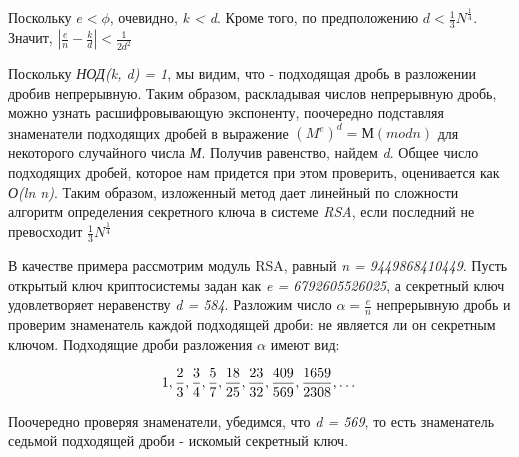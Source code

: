   Поскольку \textit{{$e < \phi$}}, очевидно, \textit{k < d}. Кроме того, по предположению \textit{{$d < \frac{1}{3} N^\frac{1}{4} $}}. Значит, 
  \textit{{$ |\frac{e}{n} - \frac{k}{d}| < \frac{1}{2 d^2} $}}
  
  Поскольку \textit{НОД(k, d) = 1}, мы видим, что - подходящая дробь в разложении дробив непрерывную. Таким образом, раскладывая числов непрерывную дробь, можно узнать 
  расшифровывающую экспоненту, поочередно подставляя знаменатели подходящих дробей в выражение \textit{{$(M^e)^d= М (mod n)$}} для некоторого случайного числа \textit{М}. 
  Получив равенство, найдем \textit{d}. Общее число подходящих дробей, которое нам придется при этом проверить, оценивается как \textit{О(ln n)}. 
  Таким образом, изложенный метод дает линейный по сложности алгоритм определения секретного ключа в системе \textit{RSA}, если последний не превосходит 
  \textit{{$\frac{1}{3} N^\frac{1}{4} $}}
  
  \begin{example}
    В качестве примера рассмотрим модуль RSA, равный \textit{n = 9449868410449}. Пусть открытый ключ криптосистемы задан как \textit{e = 6792605526025},
    а секретный ключ удовлетворяет неравенству \textit{d = 584}. Разложим число \textit{{$ \alpha = \frac{e}{n} $}} непрерывную дробь и проверим знаменатель каждой 
    подходящей дроби: не является ли он секретным ключом. Подходящие дроби разложения \textit{{$ \alpha $}} имеют вид:
    
      \begin{equation}
	\textit{{$ 1, \frac{2}{3}, \frac{3}{4}, \frac{5}{7}, \frac{18}{25}, \frac{23}{32}, \frac{409}{569}, \frac{1659}{2308}, \dots$}}
      \end{equation}

    Поочередно проверяя знаменатели, убедимся, что \textit{d = 569}, то есть знаменатель седьмой подходящей дроби - искомый секретный ключ.
  \end{example}



